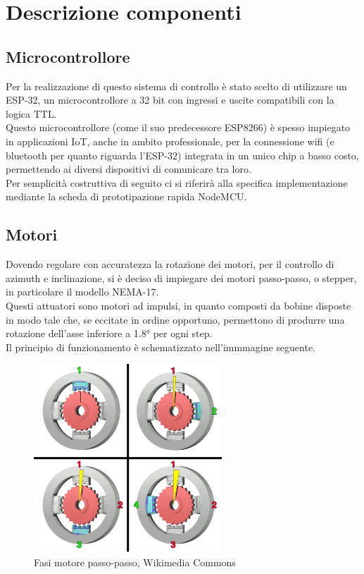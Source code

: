 \documentclass[12pt]{article}
\begin{document}
\section{Descrizione componenti}
    \subsection{Microcontrollore}
    Per la realizzazione di questo sistema di controllo è stato scelto di utilizzare un ESP-32, un microcontrollore a 32 bit con ingressi e uscite compatibili con la logica TTL.\\
    Questo microcontrollore (come il suo predecessore ESP8266) è spesso impiegato in applicazioni IoT, anche in ambito professionale, per la connessione wifi (e bluetooth per quanto riguarda l'ESP-32) integrata in un unico chip a basso costo, permettendo ai diversi dispositivi di comunicare tra loro.\\
    Per semplicità costruttiva di seguito ci si riferirà alla specifica implementazione me\-dian\-te la scheda di prototipazione rapida NodeMCU.
    
    \subsection{Motori}
    Dovendo regolare con accuratezza la rotazione dei motori, per il controllo di azimuth e inclinazione, si è deciso di impiegare dei motori passo-passo, o stepper, in particolare il modello NEMA-17.\\
    Questi attuatori sono motori ad impulsi, in quanto composti da bobine disposte in modo tale che, se eccitate in ordine opportuno, permettono di produrre una rotazione dell'asse inferiore a 1.8° per ogni step.\\
    Il principio di funzionamento è schematizzato nell'immmagine seguente.\\
    
    
    
    \begin{figure}[h]
    \centering
        \includegraphics[width=200pt]{Draws/Animations/StepperMotor.png}
        \caption{Fasi motore passo-passo, Wikimedia Commons \protect\footnotemark}
    \end{figure}
    
\end{document}
